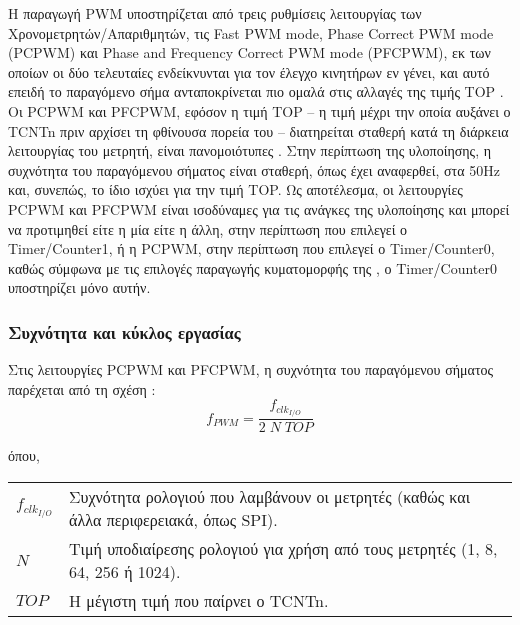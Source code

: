 Η παραγωγή PWM υποστηρίζεται από τρεις ρυθμίσεις λειτουργίας των
Χρονομετρητών\slash Απαριθμητών, τις \textenglish{Fast PWM mode, Phase Correct
PWM mode (PCPWM)} και \textenglish{Phase and Frequency Correct PWM mode
(PFCPWM)}, εκ των οποίων οι δύο τελευταίες ενδείκνυνται για τον έλεγχο κινητήρων
εν γένει, και αυτό επειδή το παραγόμενο σήμα ανταποκρίνεται πιο ομαλά στις
αλλαγές της τιμής TOP \parencite[126,128]{atmel13}. Οι PCPWM και PFCPWM, εφόσον
η τιμή TOP -- η τιμή μέχρι την οποία αυξάνει ο TCNTn πριν αρχίσει τη φθίνουσα
πορεία του -- διατηρείται σταθερή κατά τη διάρκεια λειτουργίας του μετρητή,
είναι πανομοιότυπες \parencite[127]{atmel13}. Στην περίπτωση της υλοποίησης, η
συχνότητα του παραγόμενου σήματος είναι σταθερή, όπως έχει αναφερθεί, στα 50Hz
και, συνεπώς, το ίδιο ισχύει για την τιμή TOP. Ως αποτέλεσμα, οι λειτουργίες
PCPWM και PFCPWM είναι ισοδύναμες για τις ανάγκες της υλοποίησης και μπορεί να
προτιμηθεί είτε η μία είτε η άλλη, στην περίπτωση που επιλεγεί ο
\textenglish{Timer\slash Counter1}, ή η PCPWM, στην περίπτωση που επιλεγεί ο
\textenglish{Timer\slash Counter0}, καθώς σύμφωνα με τις επιλογές παραγωγής
κυματομορφής της \textcite[107]{atmel13}, ο \textenglish{Timer\slash Counter0}
υποστηρίζει μόνο αυτήν.


\subsubsection{Συχνότητα και κύκλος εργασίας}

Στις λειτουργίες PCPWM και PFCPWM, η συχνότητα του παραγόμενου σήματος παρέχεται
από τη σχέση \parencite[102,128,129]{atmel13}:
\begin{equation}
\label{eq:motor:f_pwm}
f_{PWM} = \frac{f_{clk_{I/O}}} {2\;N\;TOP}
\end{equation}

\noindent όπου, \\
\begin{tabu}{X[-1] @{ : }  X}
$f_{clk_{I/O}}$ & Συχνότητα ρολογιού που λαμβάνουν οι μετρητές (καθώς και
                  άλλα περιφερειακά, όπως SPI).                               \\
$N$             & Τιμή υποδιαίρεσης ρολογιού για χρήση από τους μετρητές (1,
                  8, 64, 256 ή 1024).                                         \\
$TOP$           & Η μέγιστη τιμή που παίρνει ο TCNTn.
\end{tabu}

